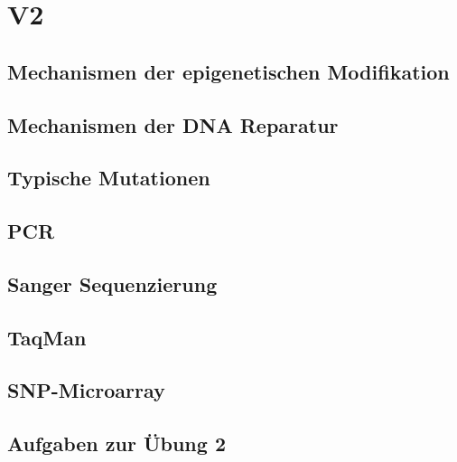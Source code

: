 \section{V2}
\subsection{Mechanismen der epigenetischen Modifikation}

\subsection{Mechanismen der DNA Reparatur}

\subsection{Typische Mutationen}

\subsection{PCR}

\subsection{Sanger Sequenzierung}

\subsection{TaqMan}

\subsection{SNP-Microarray}

\subsection{Aufgaben zur Übung 2}